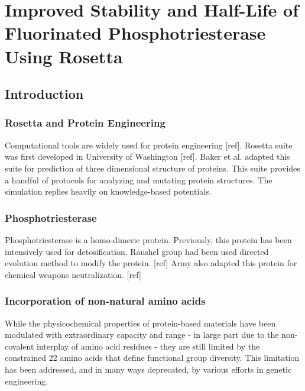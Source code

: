 \chapter{Improved Stability and Half-Life of Fluorinated Phosphotriesterase Using Rosetta}
\label{chap:rosetta}
\begin{refsection}

\section{Introduction}

\subsection{Rosetta and Protein Engineering}

Computational tools are widely used for protein engineering [ref]. Rosetta
suite was first developed in University of Washington [ref]. Baker et al.
adapted this suite for prediction of three dimensional structure of proteins.
This suite provides a handful of protocols for analyzing and mutating protein
structures. The simulation replies heavily on knowledge-based potentials.

\subsection{Phosphotriesterase}
\label{sec:pte}

Phosphotriesterase is a homo-dimeric protein. Previously, this protein has been
intensively used for detosification. Raushel group had been used directed
evolution method to modify the protein. [ref] Army also adapted this protein
for chemical weapons neutralization. [ref]

\subsection{Incorporation of non-natural amino acids}

While the physicochemical properties of protein-based materials have been
modulated with extraordinary capacity and range - in large part due to
the non-covalent interplay of amino acid residues - they are still limited by
the constrained 22 amino acids that define functional group diversity.
This limitation has been addressed, and in many ways deprecated, by various
efforts in genetic engineering.


\end{refsection}
